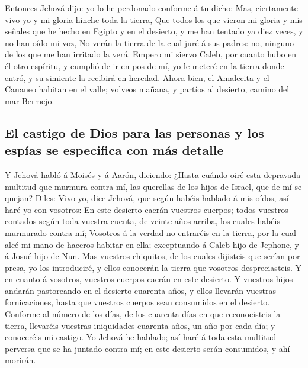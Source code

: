 Entonces Jehová dijo: yo lo he perdonado conforme á tu
dicho:  Mas, ciertamente vivo yo y mi gloria hinche toda
la tierra,  Que todos los que vieron mi gloria y mis
señales que he hecho en Egipto y en el desierto, y me han tentado ya
diez veces, y no han oído mi voz,  No verán la tierra de
la cual juré á sus padres: no, ninguno de los que me han irritado la
verá.  Empero mi siervo Caleb, por cuanto hubo en él otro
espíritu, y cumplió de ir en pos de mí, yo le meteré en la tierra donde
entró, y su simiente la recibirá en heredad.  Ahora bien,
el Amalecita y el Cananeo habitan en el valle; volveos mañana, y partíos
al desierto, camino del mar Bermejo.

\hypertarget{el-castigo-de-dios-para-las-personas-y-los-espuxedas-se-especifica-con-muxe1s-detalle}{%
\subsection{El castigo de Dios para las personas y los espías se
especifica con más
detalle}\label{el-castigo-de-dios-para-las-personas-y-los-espuxedas-se-especifica-con-muxe1s-detalle}}

 Y Jehová habló á Moisés y á Aarón, diciendo:
 ¿Hasta cuándo oiré esta depravada multitud que murmura
contra mí, las querellas de los hijos de Israel, que de mí se quejan?
 Diles: Vivo yo, dice Jehová, que según habéis hablado á
mis oídos, así haré yo con vosotros:  En este desierto
caerán vuestros cuerpos; todos vuestros contados según toda vuestra
cuenta, de veinte años arriba, los cuales habéis murmurado contra mí;
 Vosotros á la verdad no entraréis en la tierra, por la
cual alcé mi mano de haceros habitar en ella; exceptuando á Caleb hijo
de Jephone, y á Josué hijo de Nun.  Mas vuestros
chiquitos, de los cuales dijisteis que serían por presa, yo los
introduciré, y ellos conocerán la tierra que vosotros despreciasteis.
 Y en cuanto á vosotros, vuestros cuerpos caerán en este
desierto.  Y vuestros hijos andarán pastoreando en el
desierto cuarenta años, y ellos llevarán vuestras fornicaciones, hasta
que vuestros cuerpos sean consumidos en el desierto. 
Conforme al número de los días, de los cuarenta días en que
reconocisteis la tierra, llevaréis vuestras iniquidades cuarenta años,
un año por cada día; y conoceréis mi castigo.  Yo Jehová
he hablado; así haré á toda esta multitud perversa que se ha juntado
contra mí; en este desierto serán consumidos, y ahí morirán.

